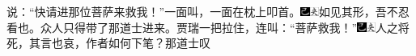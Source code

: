 说：``快请进那位菩萨来救我！''一面叫，一面在枕上叩首。{\includegraphics[width=3mm]{../Images/00003}\includegraphics[width=3mm]{../Images/00012}\footnotesize \kaishu 如见其形，吾不忍看也。}众人只得带了那道士进来。贾瑞一把拉住，连叫：``菩萨救我！''{\includegraphics[width=3mm]{../Images/00003}\includegraphics[width=3mm]{../Images/00012}\footnotesize \kaishu 人之将死，其言也哀，作者如何下笔？}那道士叹